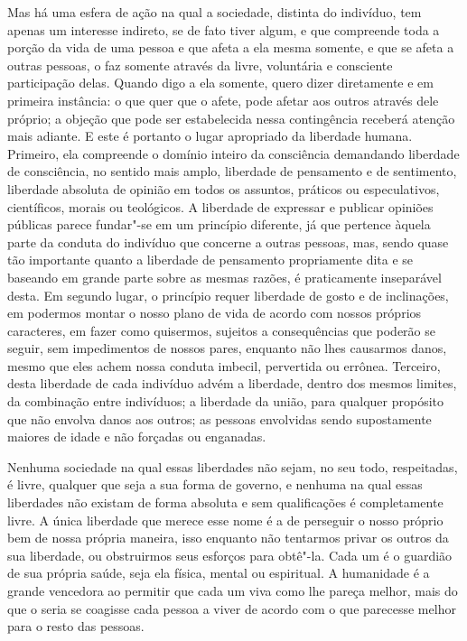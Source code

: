 Mas há uma esfera de ação na qual a sociedade, distinta do indivíduo,
tem apenas um interesse indireto, se de fato tiver algum, e que
compreende toda a porção da vida de uma pessoa e que afeta a ela mesma
somente, e que se afeta a outras pessoas, o faz somente através da
livre, voluntária e consciente participação delas. Quando digo a
ela somente, quero dizer diretamente e em primeira instância: o
que quer que o afete, pode afetar aos outros através dele próprio; a
objeção que pode ser estabelecida nessa contingência receberá atenção
mais adiante. E este é portanto o lugar apropriado da liberdade humana.
Primeiro, ela compreende o domínio inteiro da consciência demandando
liberdade de consciência, no sentido mais amplo, liberdade de
pensamento e de sentimento, liberdade absoluta de opinião em todos os
assuntos, práticos ou especulativos, científicos, morais ou teológicos.
A liberdade de expressar e publicar opiniões públicas parece fundar"-se
em um princípio diferente, já que pertence àquela parte da conduta
do indivíduo que concerne a outras pessoas, mas, sendo quase tão
importante quanto a liberdade de pensamento propriamente dita e se
baseando em grande parte sobre as mesmas razões, é praticamente
inseparável desta. Em segundo lugar, o princípio requer liberdade de gosto e
de inclinações, em podermos montar o nosso plano de vida de acordo com
nossos próprios caracteres, em fazer como
quisermos, sujeitos a consequências que poderão se seguir, sem
impedimentos de nossos pares, enquanto não lhes causarmos danos, mesmo
que eles achem nossa conduta imbecil, pervertida ou errônea. Terceiro,
desta liberdade de cada indivíduo advém a liberdade, dentro dos mesmos
limites, da combinação entre indivíduos; a liberdade da união, para
qualquer propósito que não envolva danos aos outros; as pessoas
envolvidas sendo supostamente maiores de idade e não
forçadas ou enganadas. 

Nenhuma sociedade na qual essas liberdades não sejam, no seu todo,
respeitadas, é livre, qualquer que seja a sua forma de governo, e
nenhuma na qual essas liberdades não existam de
forma absoluta e sem qualificações é completamente livre. A única liberdade que merece esse
nome é a de perseguir o nosso próprio bem de nossa própria maneira,
isso enquanto não tentarmos privar os outros da sua liberdade, ou
obstruirmos seus esforços para obtê"-la. Cada um é o guardião de
sua própria saúde, seja ela física, mental ou espiritual. A humanidade
é a grande vencedora ao permitir que cada um viva como lhe pareça
melhor, mais do que o seria se coagisse cada pessoa a viver de acordo
com o que parecesse melhor para o resto das pessoas. 

